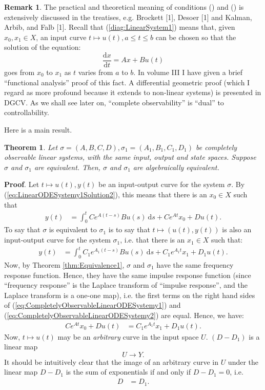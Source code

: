 \documentclass[12pt]{book}
\theoremstyle{plain}
\newtheorem{theorem}{Theorem}[section]
\theoremstyle{definition}
\newtheorem*{remark}{Remark}
\newcommand{\dd}[1]{\mathrm{d}#1}
\begin{document}
\begin{remark}
    The practical and theoretical meaning of conditions () and () is extensively discussed in the treatises, e.g. Brockett [1], Desoer [1] and Kalman, Arbib, and Falb [1]. %
    Recall that (\ref{diag:LinearSystem1}) means that, given $x_0, x_1 \in X$, an input curve $t \mapsto u(t), a \leq t \leq b$ can be chosen so that the solution of the equation:
    $$\frac{\dd{x}}{\dd{t}} = Ax + Bu(t)$$
    goes from $x_0$ to $x_1$ as $t$ varies from $a$ to $b$.
    In volume III I have given a brief ``functional analysis'' proof of this fact.
    A differential geometric proof (which I regard as more profound because it extends to non-linear systems) is presented in DGCV.
    As we shall see later on, ``complete observability'' is ``dual'' to controllability.
\end{remark}

Here is a main result.

\begin{theorem} \label{thm:Equivalence2}
    Let $\sigma = (A, B, C, D), \sigma_1 = (A_1, B_1, C_1, D_1)$ be completely observable linear systems, with the same input, output and state spaces.
    Suppose $\sigma$ and $\sigma_1$ are equivalent. Then, $\sigma$ and $\sigma_1$ are algebraically equivalent.
\end{theorem}

\textbf{Proof}.
Let $t \mapsto u(t), y(t)$ be an input-output curve for the system $\sigma$.
By (\ref{eq:LinearODESystemy1Solution2}), this means that there is an $x_0 \in X$ such that
\begin{align} \label{eq:CompletelyObservableLinearODESystemy1}
    y(t) &= \int_0^t Ce^{A(t-s)}Bu(s)\ \dd{s} + Ce^{At}x_0 + Du(t).
\end{align}
To say that $\sigma$ is equivalent to $\sigma_1$ is to say that $t \mapsto (u(t), y(t))$ is also an input-output curve for the system $\sigma_1$, i.e. that there is an $x_1 \in X$ such that:
\begin{align} \label{eq:CompletelyObservableLinearODESystemy2}
    y(t) &= \int_0^t C_1e^{A_1(t-s)}Bu(s)\ \dd{s} + C_1e^{A_1t}x_1 + D_1u(t).
\end{align}
Now, by Theorem \ref{thm:Equivalence1}, $\sigma$ and $\sigma_1$ have the same frequency response function.
Hence, they have the same impulse response function (since ``frequency response'' is the Laplace transform of ``impulse response'', and the Laplace transform is a one-one map), i.e. the first terms on the right hand sides of (\ref{eq:CompletelyObservableLinearODESystemy1}) and (\ref{eq:CompletelyObservableLinearODESystemy2}) are equal.
Hence, we have:
\begin{align}
    Ce^{At}x_0 + Du(t) &= C_1e^{A_1t}x_1 + D_1u(t).
\end{align}
Now, $t \mapsto u(t)$ may be an \emph{arbitrary} curve in the input space $U$. $(D-D_1)$ is a linear map
$$U \to Y.$$
It should be intuitively clear that the image of an arbitrary curve in $U$ under the linear map $D-D_1$ is the sum of exponentials if and only if $D-D_1=0$, i.e.
\begin{align} \label{eq:D=D_1}
    D &= D_1.
\end{align}
\end{document}

